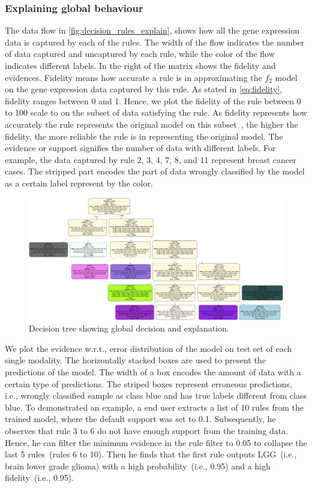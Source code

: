 \subsubsection{Explaining global behaviour}
The data flow in \cref{fig:decision_rules_explain}, shows how all the gene expression data is captured by each of the rules. The width of the flow indicates the number of data captured and uncaptured by each rule, while the color of the flow indicates different labels. In the right of the matrix shows the fidelity and evidences. Fidelity means how accurate a rule is in approximating the $f_2$ model on the gene expression data captured by this rule. 
As stated in \cref{eq:fidelity}, fidelity ranges between 0 and 1. Hence, we plot the fidelity of the rule between 0 to 100 scale to on the subset of data satisfying the rule. As fidelity represents how accurately the rule represents the original model on this subset~\cite{ming2018rulematrix}, the higher the fidelity, the more reliable the rule is in representing the original model. The evidence or support signifies the number of data with different labels. For example, the data captured by rule 2, 3, 4, 7, 8, and 11 represent breast cancer cases. The stripped part encodes the part of data wrongly classified by the model as a certain label represent by the color.

\begin{figure}
	\centering
		\includegraphics[scale=0.22]{images/simple_tree_pre.png}
	    \caption{Decision tree showing global decision and explanation.}
	    \label{fig:skater_global}
\end{figure}

\hspace*{3.5mm} We plot the evidence w.r.t., error distribution of the model on  test set of each single modality. The horizontally stacked boxes are used to present the predictions of the model. The width of a box encodes the amount of data with a certain type of predictions. The striped boxes represent erroneous predictions, i.e., wrongly classified  sample as class blue and has true labels different from class blue. To demonstrated an example, a end user extracts a list of 10 rules from the trained model, where the default support was set to 0.1. Subsequently, he observes that rule 3 to 6 do not have enough support from the training data. Hence, he can filter the minimum evidence in the rule filter to 0.05 to collapse the last 5 rules~(rules 6 to 10). Then he finds that the first rule outputs LGG~(i.e., brain lower grade glioma) with a high probability~(i.e., 0.95) and a high fidelity~(i.e., 0.95). 

